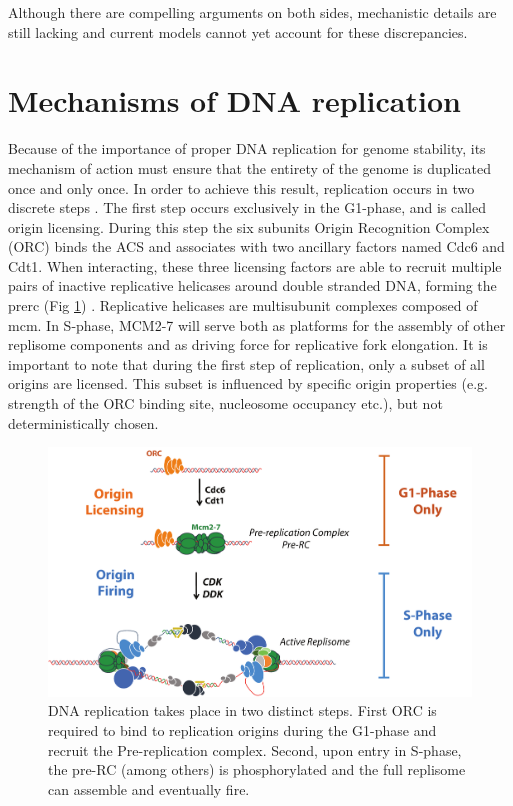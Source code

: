 Although there are compelling arguments on both sides, mechanistic details are still lacking and current models cannot yet account for these discrepancies.

\section{Mechanisms of DNA replication}

Because of the importance of proper DNA replication for genome stability, its mechanism of action must ensure that the entirety of the genome is duplicated once and only once. 
In order to achieve this result, replication occurs in two discrete steps \cite{diffley:1994:two}.
The first step occurs exclusively in the G1-phase, and is called origin licensing.
During this step the six subunits Origin Recognition Complex (ORC) binds the ACS and associates with two ancillary factors named Cdc6 and Cdt1. 
When interacting, these three licensing factors are able to recruit multiple pairs of inactive replicative helicases around double stranded DNA, forming the \gls{prerc} (Fig \ref{fig:repSteps}) \cite{gambus:2011:mcm27, remus:2009:concerted, seki:2000:stepwise, rowles:1999:changes, donovan:1997:cdc6pdependent}.
Replicative helicases are multisubunit complexes composed of \gls{mcm}. 
In S-phase, MCM2-7 will serve both as platforms for the assembly of other replisome components and as driving force for replicative fork elongation. 
It is important to note that during the first step of replication, only a subset of all origins are licensed. This subset is influenced by specific origin properties (e.g. strength of the ORC binding site, nucleosome occupancy etc.), but not deterministically chosen.

\begin{figure}[ht]

\centering
\includegraphics[width=\textwidth]{figures/introduction/repSteps}
\caption[Stepwise mechanism of DNA replication]{DNA replication takes place in two distinct steps. First ORC is required to bind to replication origins during the G1-phase and recruit the Pre-replication complex. Second, upon entry in S-phase, the pre-RC (among others) is phosphorylated and the full replisome can assemble and eventually fire.}
\label{fig:repSteps}

\end{figure}

